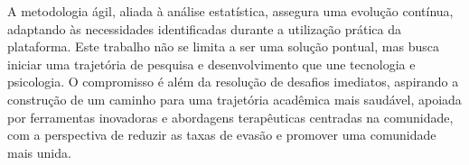 A metodologia ágil, aliada à análise estatística, assegura uma evolução contínua, adaptando às necessidades identificadas durante a utilização prática da plataforma. Este trabalho não se limita a ser uma solução pontual, mas busca iniciar uma trajetória de pesquisa e desenvolvimento que une tecnologia e psicologia. O compromisso é além da resolução de desafios imediatos, aspirando a construção de um caminho para uma trajetória acadêmica mais saudável, apoiada por ferramentas inovadoras e abordagens terapêuticas centradas na comunidade, com a perspectiva de reduzir as taxas de evasão e promover uma comunidade mais unida.



